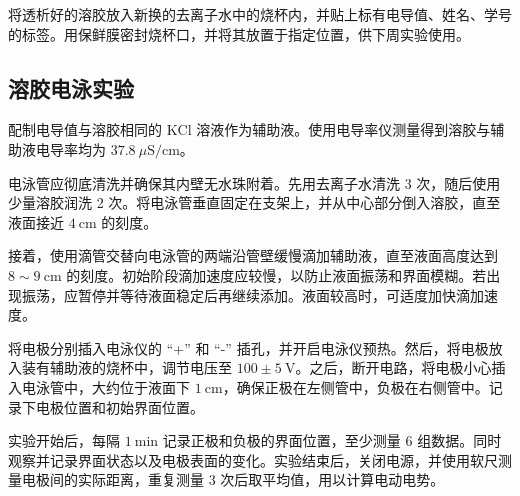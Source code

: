 将透析好的溶胶放入新换的去离子水中的烧杯内，并贴上标有电导值、姓名、学号的标签。用保鲜膜密封烧杯口，并将其放置于指定位置，供下周实验使用。

\subsection{溶胶电泳实验}

配制电导值与溶胶相同的 $\mathrm{KCl}$ 溶液作为辅助液。使用电导率仪测量得到溶胶与辅助液电导率均为 $37.8\ \mu\mathrm{S/cm}$。

电泳管应彻底清洗并确保其内壁无水珠附着。先用去离子水清洗 3 次，随后使用少量溶胶润洗 2 次。将电泳管垂直固定在支架上，并从中心部分倒入溶胶，直至液面接近 $4\ \mathrm{cm}$ 的刻度。

接着，使用滴管交替向电泳管的两端沿管壁缓慢滴加辅助液，直至液面高度达到 $8 \sim 9\ \mathrm{cm}$ 的刻度。初始阶段滴加速度应较慢，以防止液面振荡和界面模糊。若出现振荡，应暂停并等待液面稳定后再继续添加。液面较高时，可适度加快滴加速度。

将电极分别插入电泳仪的 “+” 和 “-” 插孔，并开启电泳仪预热。然后，将电极放入装有辅助液的烧杯中，调节电压至 $100 \pm 5\ \mathrm{V}$。之后，断开电路，将电极小心插入电泳管中，大约位于液面下 $1\ \mathrm{cm}$，确保正极在左侧管中，负极在右侧管中。记录下电极位置和初始界面位置。

实验开始后，每隔 $1\ \mathrm{min}$ 记录正极和负极的界面位置，至少测量 6 组数据。同时观察并记录界面状态以及电极表面的变化。实验结束后，关闭电源，并使用软尺测量电极间的实际距离，重复测量 3 次后取平均值，用以计算电动电势。




